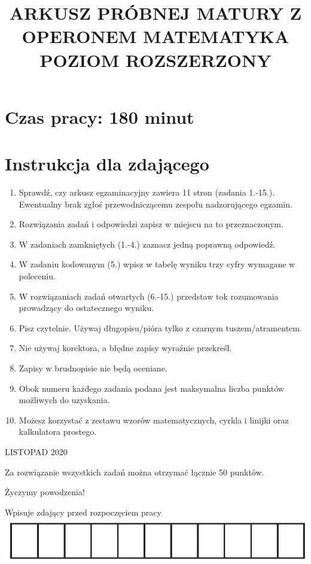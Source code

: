 \documentclass[10pt]{article}
\title{ARKUSZ PRÓBNEJ MATURY Z OPERONEM MATEMATYKA \\
 POZIOM ROZSZERZONY }
\author{}
\date{}
\begin{document}
\maketitle
\section*{Czas pracy: 180 minut}
\section*{Instrukcja dla zdającego}
\begin{enumerate}
  \item Sprawdź, czy arkusz egzaminacyjny zawiera 11 stron (zadania 1.-15.). Ewentualny brak zgłoś przewodniczącemu zespołu nadzorującego egzamin.
  \item Rozwiązania zadań i odpowiedzi zapisz w miejscu na to przeznaczonym.
  \item W zadaniach zamkniętych (1.-4.) zaznacz jedną poprawną odpowiedź.
  \item W zadaniu kodowanym (5.) wpisz w tabelę wyniku trzy cyfry wymagane w poleceniu.
  \item W rozwiązaniach zadań otwartych (6.-15.) przedstaw tok rozumowania prowadzący do ostatecznego wyniku.
  \item Pisz czytelnie. Używaj długopisu/pióra tylko z czarnym tuszem/atramentem.
  \item Nie używaj korektora, a błędne zapisy wyraźnie przekreśl.
  \item Zapisy w brudnopisie nie będą oceniane.
  \item Obok numeru każdego zadania podana jest maksymalna liczba punktów możliwych do uzyskania.
  \item Możesz korzystać z zestawu wzorów matematycznych, cyrkla i linijki oraz kalkulatora prostego.
\end{enumerate}

LISTOPAD 2020

Za rozwiązanie wszystkich zadań można otrzymać łącznie 50 punktów.

Życzymy powodzenia!

Wpisuje zdający przed rozpoczęciem pracy\\
\includegraphics[max width=\textwidth, center]{2024_11_21_599d917d55a506aace4bg-01(1)}
\end{document}
